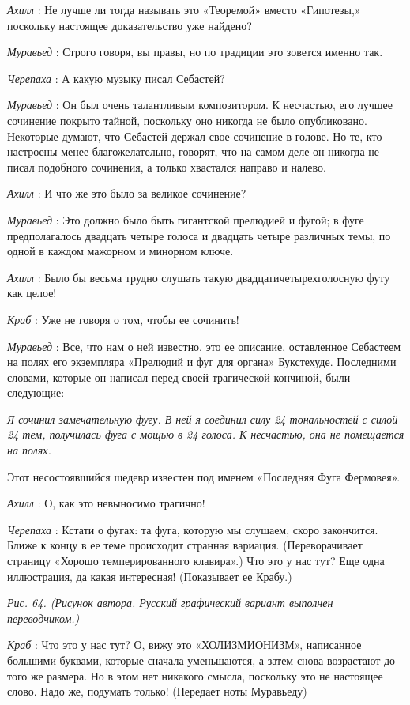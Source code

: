 \documentclass[../main.tex]{subfiles}
\begin{document}
\begin{dialogue}
\emph{Ахилл} : Не лучше ли тогда называть это «Теоремой» вместо «Гипотезы,» поскольку настоящее доказательство уже найдено?

\emph{Муравьед} : Строго говоря, вы правы, но по традиции это зовется именно так.

\emph{Черепаха} : А какую музыку писал Себастей?

\emph{Муравьед} : Он был очень талантливым композитором. К несчастью, его лучшее сочинение покрыто тайной, поскольку оно никогда не было опубликовано. Некоторые думают, что Себастей держал свое сочинение в голове. Но те, кто настроены менее благожелательно, говорят, что на самом деле он никогда не писал подобного сочинения, а только хвастался направо и налево.

\emph{Ахилл} : И что же это было за великое сочинение?

\emph{Муравьед} : Это должно было быть гигантской прелюдией и фугой; в фуге предполагалось двадцать четыре голоса и двадцать четыре различных темы, по одной в каждом мажорном и минорном ключе.

\emph{Ахилл} : Было бы весьма трудно слушать такую двадцатичетырехголосную футу как целое!

\emph{Краб} : Уже не говоря о том, чтобы ее сочинить!

\emph{Муравьед} : Все, что нам о ней известно, это ее описание, оставленное Себастеем на полях его экземпляра «Прелюдий и фуг для органа» Букстехуде. Последними словами, которые он написал перед своей трагической кончиной, были следующие:

\emph{Я сочинил замечательную фугу. В ней я соединил силу 24 тональностей с силой 24 тем, получилась фуга с мощью в 24 голоса. К несчастью, она не помещается на полях.}

Этот несостоявшийся шедевр известен под именем «Последняя Фуга Фермовея».

\emph{Ахилл} : О, как это невыносимо трагично!

\emph{Черепаха} : Кстати о фугах: та фуга, которую мы слушаем, скоро закончится. Ближе к концу в ее теме происходит странная вариация. (Переворачивает страницу «Хорошо темперированного клавира».) Что это у нас тут? Еще одна иллюстрация, да какая интересная! (Показывает ее Крабу.)

\emph{Рис. 64. (Рисунок автора. Русский графический вариант выполнен переводчиком.)}

\emph{Краб} : Что это у нас тут? О, вижу это «ХОЛИЗМИОНИЗМ», написанное большими буквами, которые сначала уменьшаются, а затем снова возрастают до того же размера. Но в этом нет никакого смысла, поскольку это не настоящее слово. Надо же, подумать только! (Передает ноты Муравьеду)


\end{dialogue}
\end{document}
